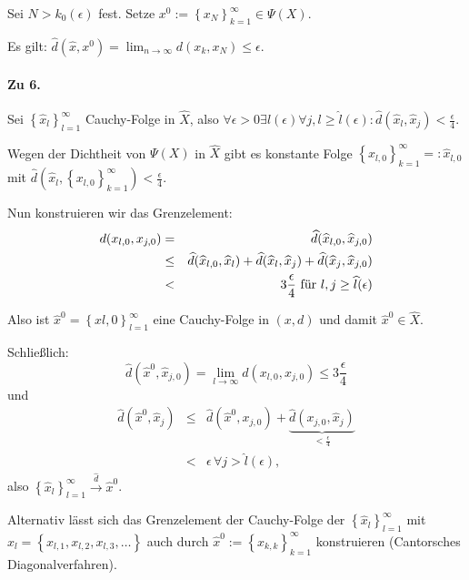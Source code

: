 \documentclass[10pt]{scrbook}
\begin{document}
\begin{bew}
Sei $N>k_0(\epsilon)$ fest. Setze $x^0:=\left\{x_N\right\}_{k=1}^\infty\in\Psi(X)$.

Es gilt: $\widehat{d}(\widehat{x}, x^0)=\lim_{n\rightarrow \infty} d(x_k, x_N)\leq \epsilon$.

\paragraph{Zu 6.} Sei $\left\{\widehat{x}_l\right\}_{l=1}^\infty$ Cauchy-Folge in $\widehat{X}$, also $\forall \epsilon>0\exists \widehat{l}(\epsilon) \forall j, l\geq \widehat{l}(\epsilon): \widehat{d}(\widehat{x}_l, \widehat{x}_j)<\frac{\epsilon}{4}$.

Wegen der Dichtheit von $\Psi(X)$ in $\widehat{X}$ gibt es konstante Folge $\left\{x_{l, 0}\right\}_{k=1}^\infty=:\widehat{x}_{l, 0}$ mit $\widehat{d}(\widehat{x}_l, \left\{x_{l, 0}\right\}_{k=1}^\infty)<\frac{\epsilon}{4}$.

Nun konstruieren wir das Grenzelement:
\begin{eqnarray*}
	d(x_{l, 0}, x_{j, 0}) & = & \widehat{d}(\widehat{x}_{l, 0}, \widehat{x}_{j, 0}) \\
	& \leq & \widehat{d}(\widehat{x}_{l, 0}, \widehat{x}_l)+\widehat{d}(\widehat{x}_l, \widehat{x}_j)+\widehat{d}(\widehat{x}_j, \widehat{x}_{j, 0}) \\
	& < & 3\frac{\epsilon}{4}\textnormal{ für }l, j\geq \widehat{l}(\epsilon)
\end{eqnarray*}

Also ist $\widehat{x}^0=\left\{x{l, 0}\right\}_{l=1}^\infty$ eine Cauchy-Folge in $(x, d)$ und damit $\widehat{x}^0\in \widehat{X}$.

Schließlich: 
\begin{displaymath}
\widehat{d}(\widehat{x}^0, \widehat{x}_{j, 0})=\lim_{l\rightarrow \infty} d(x_{l, 0}, x_{j, 0})\leq 3\frac{\epsilon}{4}
\end{displaymath}
und
\begin{eqnarray*}
\widehat{d}(\widehat{x}^0, \widehat{x}_j) & \leq & \widehat{d}(\widehat{x}^0, x_{j, 0}) +\underbrace{ \widehat{d}(x_{j, 0}, \widehat{x}_j)}_{<\frac{\epsilon}{4}} \\
& < & \epsilon\, \forall j>\widehat{l}(\epsilon),
\end{eqnarray*}
also $\left\{\widehat{x}_l\right\}_{l=1}^\infty\stackrel{\widehat{d}}{\rightarrow} \widehat{x}^0$.
\end{bew}

\begin{Bem}
Alternativ lässt sich das Grenzelement der Cauchy-Folge der $\left\{\widehat{x}_l\right\}_{l=1}^\infty$ mit $\widehat{x}_l=\left\{x_{l, 1}, x_{l, 2}, x_{l, 3}, \ldots\right\}$ auch durch $\widehat{x}^0:=\left\{x_{k, k}\right\}_{k=1}^\infty$ konstruieren (Cantorsches Diagonalverfahren).
\end{Bem}
\end{document}
